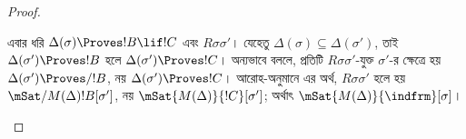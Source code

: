 \documentclass[../../../include/open-logic-section]{subfiles}
\begin{document}
\begin{proof}
\begin{enumerate}
{      এবার ধরি $\Delta(\sigma) \Proves !B \lif !C$ এবং
      $R\sigma\sigma'$। যেহেতু $\Delta(\sigma) \subseteq
      \Delta(\sigma')$, তাই $\Delta(\sigma') \Proves !B$
      হলে $\Delta(\sigma') \Proves !C$। অন্যভাবে বললে, প্রতিটি
      $R\sigma\sigma'$-যুক্ত $\sigma'$-র ক্ষেত্রে হয়
      $\Delta(\sigma') \Proves/ !B$, নয়
      $\Delta(\sigma') \Proves !C$। আরোহ-অনুমানে এর অর্থ,
      $R\sigma\sigma'$ হলে হয়
      $\mSat/{M(\Delta)}{!B}[\sigma']$, নয়
      $\mSat{M(\Delta)}{!C}[\sigma']$; অর্থাৎ
      $\mSat{M(\Delta)}{\indfrm}[\sigma]$।}
  \end{enumerate}
\end{proof}
\end{document}
